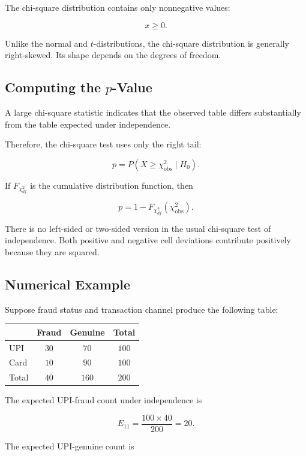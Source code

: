 \documentclass[11pt]{article}
\begin{document}
The chi-square distribution contains only nonnegative values:

\[
x\geq0.
\]

Unlike the normal and \(t\)-distributions, the chi-square distribution is
generally right-skewed. Its shape depends on the degrees of freedom.

\subsection{Computing the \(p\)-Value}

A large chi-square statistic indicates that the observed table differs
substantially from the table expected under independence.

Therefore, the chi-square test uses only the right tail:

\[
\boxed{
p
=
P\left(
X\geq\chi^2_{\mathrm{obs}}
\mid H_0
\right).
}
\]

If \(F_{\chi^2_{df}}\) is the cumulative distribution function, then

\[
\boxed{
p
=
1-F_{\chi^2_{df}}
\left(
\chi^2_{\mathrm{obs}}
\right).
}
\]

There is no left-sided or two-sided version in the usual chi-square test
of independence. Both positive and negative cell deviations contribute
positively because they are squared.

\subsection{Numerical Example}

Suppose fraud status and transaction channel produce the following
table:

\begin{center}
\begin{tabular}{lccc}
\toprule
 & Fraud & Genuine & Total \\
\midrule
UPI  & \(30\) & \(70\) & \(100\) \\
Card & \(10\) & \(90\) & \(100\) \\
\midrule
Total & \(40\) & \(160\) & \(200\) \\
\bottomrule
\end{tabular}
\end{center}

The expected UPI-fraud count under independence is

\[
E_{11}
=
\frac{100\times40}{200}
=
20.
\]

The expected UPI-genuine count is
\end{document}
